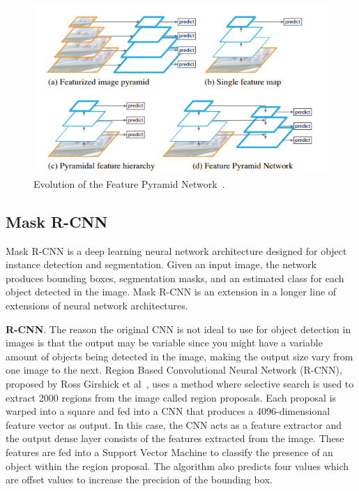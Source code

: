 \documentclass[oneside, english, bibtex]{kththesis}
\begin{document}
\begin{figure}[H]
  \begin{center}
    \includegraphics[width=1.0\textwidth]{figures/fpn.png}
  \end{center}
  \caption{Evolution of the Feature Pyramid Network~\cite{DBLP:journals/corr/LinDGHHB16}.}
  \label{fig:fpn}
\end{figure}

\subsection{Mask R-CNN}
\label{subs:maskrcnn}

Mask R-CNN is a deep learning neural network architecture designed for object instance detection and segmentation. Given an input image, the network produces bounding boxes, segmentation masks, and an estimated class for each object detected in the image. Mask R-CNN is an extension in a longer line of extensions of neural network architectures.

\textbf{R-CNN}. The reason the original CNN is not ideal to use for object detection in images is that the output may be variable since you might have a variable amount of objects being detected in the image, making the output size vary from one image to the next. Region Based Convolutional Neural Network (R-CNN), proposed by Ross Girshick et al~\cite{Girshick_2014_CVPR}, uses a method where selective search is used to extract 2000 regions from the image called region proposals. Each proposal is warped into a square and fed into a CNN that produces a 4096-dimensional feature vector as output. In this case, the CNN acts as a feature extractor and the output dense layer consists of the features extracted from the image. These features are fed into a Support Vector Machine to classify the presence of an object within the region proposal. The algorithm also predicts four values which are offset values to increase the precision of the bounding box.
\end{document}
